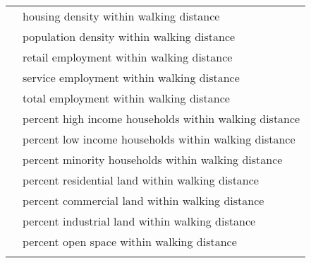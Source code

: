 \begin{tabular}{lp{4in}}
           & housing density within walking distance \\

           & population density within walking distance \\

           & retail employment within walking distance \\

           & service employment within walking distance \\

           & total employment within walking distance \\

           & percent high income households within walking distance \\

           & percent low income households within walking distance \\

           & percent minority households within walking distance \\

           & percent residential land within walking distance \\

           & percent commercial land within walking distance \\

           & percent industrial land within walking distance \\

           & percent open space within walking distance \\
\hline
           &            \\

\end{tabular}  

